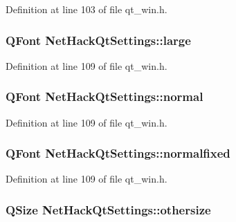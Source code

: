 Definition at line 103 of file qt\+\_\+win.\+h.

\hypertarget{classNetHackQtSettings_acac51e1ea0e554eb2dbe6eecf783d07e}{
\subsubsection[{large}]{\setlength{\rightskip}{0pt plus 5cm}Q\+Font Net\+Hack\+Qt\+Settings\+::large\hspace{0.3cm}{\ttfamily [private]}}}\label{classNetHackQtSettings_acac51e1ea0e554eb2dbe6eecf783d07e}


Definition at line 109 of file qt\+\_\+win.\+h.

\hypertarget{classNetHackQtSettings_a86df56bfe2cd97a6d45a8d3325334111}{
\subsubsection[{normal}]{\setlength{\rightskip}{0pt plus 5cm}Q\+Font Net\+Hack\+Qt\+Settings\+::normal\hspace{0.3cm}{\ttfamily [private]}}}\label{classNetHackQtSettings_a86df56bfe2cd97a6d45a8d3325334111}


Definition at line 109 of file qt\+\_\+win.\+h.

\hypertarget{classNetHackQtSettings_aa5aa4bec82f3db5187cfb7bd8549c020}{
\subsubsection[{normalfixed}]{\setlength{\rightskip}{0pt plus 5cm}Q\+Font Net\+Hack\+Qt\+Settings\+::normalfixed\hspace{0.3cm}{\ttfamily [private]}}}\label{classNetHackQtSettings_aa5aa4bec82f3db5187cfb7bd8549c020}


Definition at line 109 of file qt\+\_\+win.\+h.

\hypertarget{classNetHackQtSettings_a875bdf452d69d2dda5c785808538c817}{
\subsubsection[{othersize}]{\setlength{\rightskip}{0pt plus 5cm}Q\+Size Net\+Hack\+Qt\+Settings\+::othersize\hspace{0.3cm}{\ttfamily [private]}}}\label{classNetHackQtSettings_a875bdf452d69d2dda5c785808538c817}


